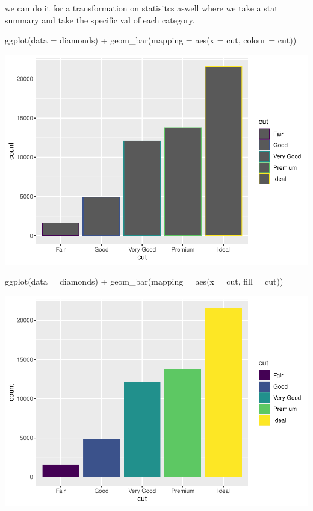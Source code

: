\documentclass[
]{article}
\newenvironment{Shaded}{\begin{snugshade}}{\end{snugshade}}
\newcommand{\AttributeTok}[1]{\textcolor[rgb]{0.77,0.63,0.00}{#1}}
\newcommand{\FunctionTok}[1]{\textcolor[rgb]{0.00,0.00,0.00}{#1}}
\newcommand{\NormalTok}[1]{#1}
\newcommand{\SpecialCharTok}[1]{\textcolor[rgb]{0.00,0.00,0.00}{#1}}
\begin{document}
we can do it for a transformation on statisitcs aswell where we take a
stat summary and take the specific val of each category.

\begin{Shaded}
\begin{Highlighting}[]
\FunctionTok{ggplot}\NormalTok{(}\AttributeTok{data =}\NormalTok{ diamonds) }\SpecialCharTok{+} 
  \FunctionTok{geom\_bar}\NormalTok{(}\AttributeTok{mapping =} \FunctionTok{aes}\NormalTok{(}\AttributeTok{x =}\NormalTok{ cut, }\AttributeTok{colour =}\NormalTok{ cut))}
\end{Highlighting}
\end{Shaded}

\includegraphics{Journal_files/figure-latex/unnamed-chunk-54-1.pdf}

\begin{Shaded}
\begin{Highlighting}[]
\FunctionTok{ggplot}\NormalTok{(}\AttributeTok{data =}\NormalTok{ diamonds) }\SpecialCharTok{+} 
  \FunctionTok{geom\_bar}\NormalTok{(}\AttributeTok{mapping =} \FunctionTok{aes}\NormalTok{(}\AttributeTok{x =}\NormalTok{ cut, }\AttributeTok{fill =}\NormalTok{ cut))}
\end{Highlighting}
\end{Shaded}

\includegraphics{Journal_files/figure-latex/unnamed-chunk-54-2.pdf}
\end{document}
